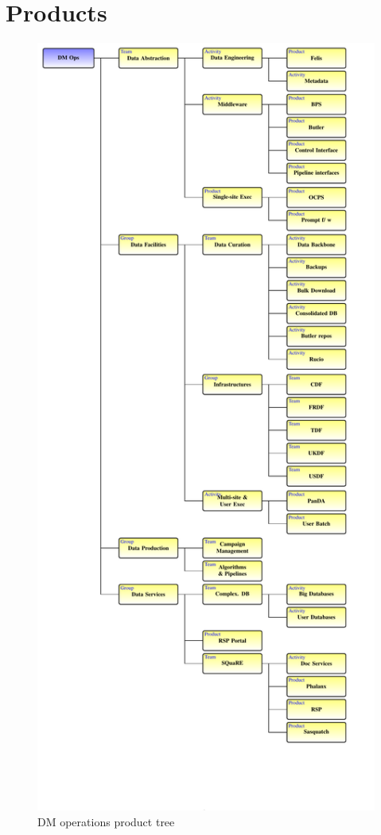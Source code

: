 \section{Products}\label{sec:products}


\begin{figure}
\begin{centering}
\includegraphics[width=1\textwidth]{ProductTree}
\caption{DM operations product tree \label{fig:producttree}}
\end{centering}
\end{figure}


